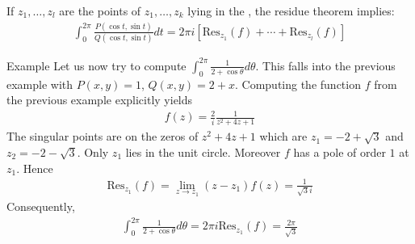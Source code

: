	If $z_1, \ldots, z_l$ are the points of $z_1, \ldots, z_k$ lying in the , the residue theorem implies:
	\begin{align*} 
	\boxed{
		\int_{0}^{2\pi}\frac{P\left(\cos t, \sin t\right)}{Q\left(\cos t, \sin t\right)} dt = 2\pi i \left[\text{Res}_{z_1}\left(f\right) + \cdots + \text{Res}_{z_l}\left(f\right)\right]}
	\end{align*}






\begin{parag}{Example}
    Let us now try to compute $\int_0^{2\pi} \frac{1}{2  + \cos \theta}d \theta$. This falls into the previous example with $P\left(x, y\right) =  1$, $Q\left(x, y\right) =  2 + x$. Computing the function $f$ from the previous example explicitly yields
	\begin{align*} 
		f\left(z\right) = \frac{2}{i}\frac{1}{z^2 + 4z + 1}
	\end{align*}
	The singular points are on the zeros of $z^2 + 4z + 1$ which are $z_1 =  -2 + \sqrt{3}$ and $z_2 =  -2 - \sqrt{3}$. Only $z_1$ lies in the unit circle. Moreover $f$ has a pole of order $1$ at $z_1$. Hence 
	\begin{align*} 
		\text{Res}_{z_1}\left(f\right) =  \lim_{z \to z_1} \left(z - z_1\right)f\left(z\right) = \frac{1}{\sqrt{3}i}
	\end{align*}
	Consequently,
	\begin{align*} 
		\int_0^{2\pi} \frac{1}{2 + \cos \theta} d \theta =  2\pi i \text{Res}_{z_1}\left(f\right) =  \frac{2\pi }{\sqrt{3}}
	\end{align*}
\end{parag}

